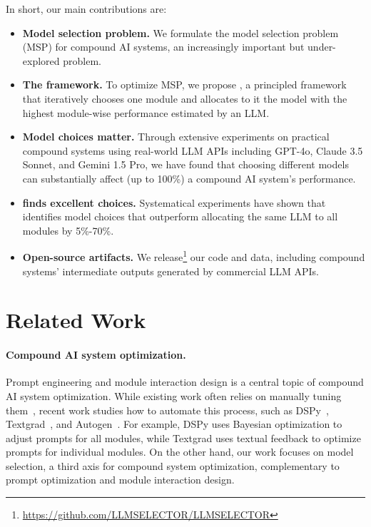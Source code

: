 In short, our main contributions are:
\begin{itemize}
\item \textbf{Model selection problem.} We formulate the model selection problem (MSP) for compound AI systems, an increasingly important but under-explored problem. \\

\item \textbf{The \deluxesystem{} framework.} To optimize MSP, we propose \deluxesystem{}, a principled framework that iteratively chooses one module and allocates to it the model with the highest module-wise performance estimated by an LLM. \\

\item \textbf{Model choices matter.} Through extensive experiments on practical compound systems using real-world LLM APIs including GPT-4o, Claude 3.5 Sonnet, and Gemini 1.5 Pro, we have found that choosing different models can substantially affect (up to 100\%) a compound AI system's performance.

\item \textbf{\deluxesystem{} finds excellent choices.} Systematical experiments have shown that \deluxesystem{} identifies model choices that outperform allocating the same LLM to all modules by 5\%-70\%.\\

\item \textbf{Open-source artifacts.} We release\footnote{\url{https://github.com/LLMSELECTOR/LLMSELECTOR}} our code and data, including compound systems' intermediate outputs generated by commercial LLM APIs.
\end{itemize}


\section{Related Work}\label{sec:deluxeagent:Relatedwork}

\paragraph{Compound AI system optimization.} Prompt engineering and module interaction design is a central topic of compound AI system optimization. While existing work often relies on manually tuning them~\cite{deepmind2025alphacode2,shinn2024reflexion,zhou2024agents2,pryzant2023automatic,fourney2024magentic,zhao2024expel,lu2024chameleon,zhao2024expel}, recent work studies how to automate this process, such as DSPy~\cite{khattab2024dspy}, Textgrad~\cite{yuksekgonul2024textgrad}, and Autogen~\cite{wu2023autogen}. For example, DSPy uses Bayesian optimization to adjust prompts for all modules, while Textgrad uses textual feedback to optimize prompts for individual modules. On the other hand, our work focuses on model selection, a third axis for compound system optimization, complementary to prompt optimization and module interaction design. 

